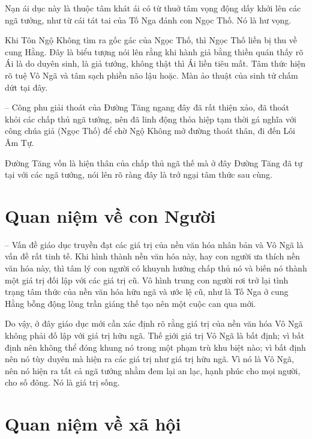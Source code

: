 Nạn ái dục này là thuộc tâm khát ái có từ thuở tâm vọng động dấy khởi lên các ngã tưởng, như từ cái tát tai của Tố Nga đánh con Ngọc Thố. Nó là hư vọng.

Khi Tôn Ngộ Không tìm ra gốc gác của Ngọc Thố, thì Ngọc Thố liền bị thu về cung Hằng. Đây là biểu tượng nói lên rằng khi hành giả bằng thiền quán thấy rõ Ái là do duyên sinh, là giả tướng, không thật thì Ái liền tiêu mất. Tâm thức hiện rõ tuệ Vô Ngã và tâm sạch phiền não lậu hoặc. Màn ảo thuật của sinh tử chấm dứt tại đây.

-- Công phu giải thoát của Đường Tăng ngang đây đã rất thiện xảo, đã thoát khỏi các chấp thủ ngã tướng, nên đã linh động thỏa hiệp tạm thời gá nghĩa với công chúa giả (Ngọc Thố) để chờ Ngộ Không mở đường thoát thân, đi đến Lôi Âm Tự.

Đường Tăng vốn là hiện thân của chấp thủ ngã thế mà ở đây Đường Tăng đã tự tại với các ngã tướng, nói lên rõ ràng đây là trở ngại tâm thức sau cùng.

\section{Quan niệm về con Người} %
\label{sec:91_92_95_con_nguoi}

-- Vấn đề giáo dục truyền đạt các giá trị của nền văn hóa nhân bản và Vô Ngã là vấn đề rất tinh tế. Khi hình thành nền văn hóa này, hay con người ưa thích nền văn hóa này, thì tâm lý con người có khuynh hướng chấp thủ nó và biến nó thành một giá trị đối lập với các giá trị cũ. Vô hình trung con người rơi trở lại tình trạng tâm thức của nền văn hóa hữu ngã và ước lệ cũ, như là Tố Nga ở cung Hằng bỗng động lòng trần giáng thế tạo nên một cuộc can qua mới.

Do vậy, ở đây giáo dục mới cần xác định rõ rằng giá trị của nền văn hóa Vô Ngã không phải đố lập với giá trị hữu ngã. Thế giới giá trị Vô Ngã là bất định; vì bất định nên không thể đóng khung nó trong một phạm trù khu biệt nào; vì bất định nên nó tùy duyên mà hiện ra các giá trị như giá trị hữu ngã. Vì nó là Vô Ngã, nên nó hiện ra tất cả ngã tướng nhằm đem lại an lạc, hạnh phúc cho mọi người, cho số đông. Nó là giá trị sống.

\section{Quan niệm về xã hội} %
\label{sec:91_92_95_xa_hoi}

